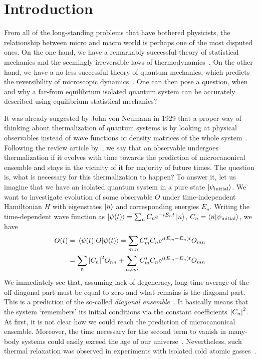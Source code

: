 \chapter{Introduction}
\thispagestyle{chapterBeginStyle}


From all of the long-standing problems that have bothered physicists, the relationship
between micro and macro world is perhaps one of the most disputed ones. On the one
hand, we have a remarkably successful theory of statistical mechanics and the seemingly
irreversible laws of thermodynamics~\autocite{huang1987statistical,Feynman1972}.
On the other hand, we have a no less successful theory of quantum mechanics,
which predicts the reversibility of microscopic dynamics~\autocite{landau1991quantum,Sakurai2017}.
One can then pose a question, when and why a far-from equilibrium isolated quantum system
can be accurately described using equilibrium statistical mechanics?

It was already suggested by John von Neumann in 1929 that a proper way of
thinking about thermalization of quantum systems is by looking at physical
observables instead of wave functions or density matrices of the whole system~\autocite{Neumann192930}.
Following the review article by~\textcite{DAlessio2016}, we say that an 
observable undergoes thermalization if it evolves with time towards the
prediction of microcanonical ensemble and stays in the vicinity of it for majority
of future times. The question is, what is necessary for this thermalization to happen?
To answer it, let us imagine that we have an isolated quantum system in a pure
state \(\ket{\psi_{\textrm{initial}}}\). We want to investigate evolution
of some observable \(O\) under time-independent Hamiltonian \(H\) with
eigenstates \(\ket{n}\) and corresponding energies \(E_n\). Writing the time-dependent
wave function as \(\ket{\psi(t)}=\sum_{n} C_{n} \mathrm{e}^{-i E_{n} t}\ket{n}\),
 \(C_n =  \braket{n}{\psi_{\textrm{initial}}}\), we have 
\begin{align}
    O(t) & =\matrixel{\psi(t)}{O}{\psi(t)}=\sum_{m, n} C_{m}^{*} C_{n} 
    \mathrm{e}^{i\left(E_{m}-E_{n}\right) t} O_{m n} \nonumber\\
    &=\sum_{n}\abs{C_{n}}^{2} O_{nn}+\sum_{n \neq m} C_{m}^{*} C_{n} 
    \mathrm{e}^{i\left(E_{m}-E_{n}\right) t} O_{m n}\label{eq:time evolution}
\end{align}
We immediately see that, assuming lack of degeneracy, long-time average of the off-diagonal
part must be equal to zero and what remains is the diagonal part.
This is a prediction of the so-called \textit{diagonal ensemble}~\autocite{Cassidy2011}.
It basically means that the system `remembers' its initial conditions via the constant
coefficients \(\abs{C_n}^2\). At first, it is not clear how we could reach the prediction of 
microcanonical ensemble. Moreover, the time necessary for the second term to vanish 
in many-body systems could easily exceed the age of our universe~\autocite{DAlessio2016}.
Nevertheless, such thermal relaxation was observed in experiments with isolated
cold atomic gasses~\autocite{Rigol2012,Rigol2008854,Hung2010,Kinoshita2006,Hofferberth2007}.


